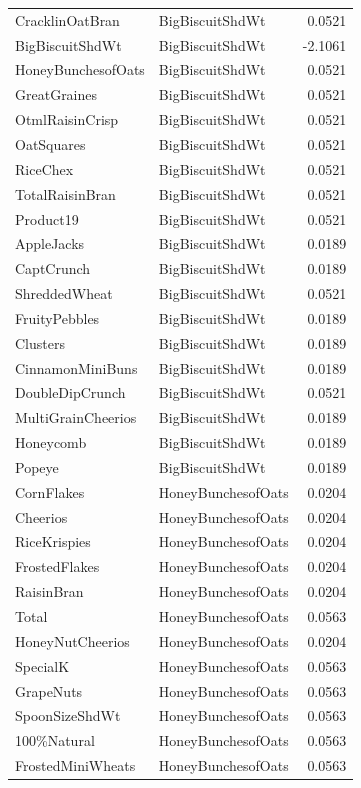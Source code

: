 \begin{longtable}{llr}
CracklinOatBran & BigBiscuitShdWt & 0.0521 \\
BigBiscuitShdWt & BigBiscuitShdWt & -2.1061 \\
HoneyBunchesofOats & BigBiscuitShdWt & 0.0521 \\
GreatGraines & BigBiscuitShdWt & 0.0521 \\
OtmlRaisinCrisp & BigBiscuitShdWt & 0.0521 \\
OatSquares & BigBiscuitShdWt & 0.0521 \\
RiceChex & BigBiscuitShdWt & 0.0521 \\
TotalRaisinBran & BigBiscuitShdWt & 0.0521 \\
Product19 & BigBiscuitShdWt & 0.0521 \\
AppleJacks & BigBiscuitShdWt & 0.0189 \\
CaptCrunch & BigBiscuitShdWt & 0.0189 \\
ShreddedWheat & BigBiscuitShdWt & 0.0521 \\
FruityPebbles & BigBiscuitShdWt & 0.0189 \\
Clusters & BigBiscuitShdWt & 0.0189 \\
CinnamonMiniBuns & BigBiscuitShdWt & 0.0189 \\
DoubleDipCrunch & BigBiscuitShdWt & 0.0521 \\
MultiGrainCheerios & BigBiscuitShdWt & 0.0189 \\
Honeycomb & BigBiscuitShdWt & 0.0189 \\
Popeye & BigBiscuitShdWt & 0.0189 \\
CornFlakes & HoneyBunchesofOats & 0.0204 \\
Cheerios & HoneyBunchesofOats & 0.0204 \\
RiceKrispies & HoneyBunchesofOats & 0.0204 \\
FrostedFlakes & HoneyBunchesofOats & 0.0204 \\
RaisinBran & HoneyBunchesofOats & 0.0204 \\
Total & HoneyBunchesofOats & 0.0563 \\
HoneyNutCheerios & HoneyBunchesofOats & 0.0204 \\
SpecialK & HoneyBunchesofOats & 0.0563 \\
GrapeNuts & HoneyBunchesofOats & 0.0563 \\
SpoonSizeShdWt & HoneyBunchesofOats & 0.0563 \\
100\%Natural & HoneyBunchesofOats & 0.0563 \\
FrostedMiniWheats & HoneyBunchesofOats & 0.0563 \\

\end{longtable}
